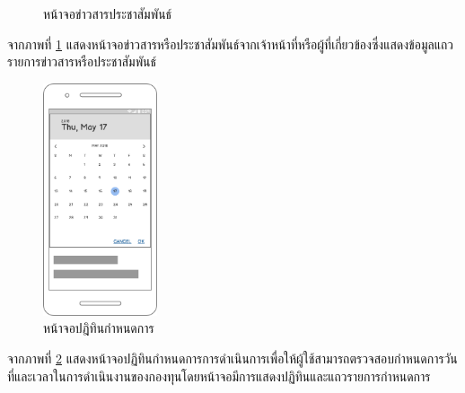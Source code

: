 \begin{enumerate}
\begin{figure}[H]
				\caption{หน้าจอข่าวสารประชาสัมพันธ์}
				\label{Fig:หน้าจอข่าวสาร}
			\end{figure}
			จากภาพที่ \ref{Fig:หน้าจอข่าวสาร} แสดงหน้าจอข่าวสารหรือประชาสัมพันธ์จากเจ้าหน้าที่หรือผู้ที่เกี่ยวข้องซึ่งแสดงข้อมูลแถวรายการข่าวสารหรือประชาสัมพันธ์
			\begin{figure}[H]
				\centering
				\includegraphics[width=0.3\textwidth]{Figures/3/Wireframe/calendar}
				\caption{หน้าจอปฎิทินกำหนดการ}
				\label{Fig:หน้าจอปฎิธินกำหนดการ}
			\end{figure}
			จากภาพที่ \ref{Fig:หน้าจอปฎิธินกำหนดการ} แสดงหน้าจอปฏิทินกำหนดการการดำเนินการเพื่อให้ผู้ใช้สามารถตรวจสอบกำหนดการวันที่และเวลาในการดำเนินงานของกองทุนโดยหน้าจอมีการแสดงปฏิทินและแถวรายการกำหนดการ


\end{enumerate}
